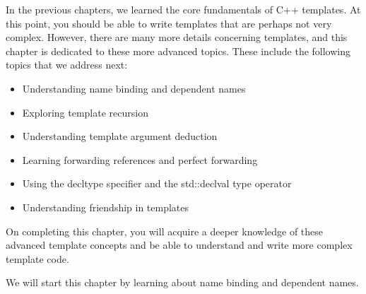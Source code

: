 In the previous chapters, we learned the core fundamentals of C++ templates. At this point, you should be able to write templates that are perhaps not very complex. However, there are many more details concerning templates, and this chapter is dedicated to these more advanced topics. These include the following topics that we address next:

\begin{itemize}
\item
Understanding name binding and dependent names

\item
Exploring template recursion

\item
Understanding template argument deduction

\item
Learning forwarding references and perfect forwarding

\item
Using the decltype specifier and the std::declval type operator

\item
Understanding friendship in templates
\end{itemize}

On completing this chapter, you will acquire a deeper knowledge of these advanced template concepts and be able to understand and write more complex template code.

We will start this chapter by learning about name binding and dependent names.




















